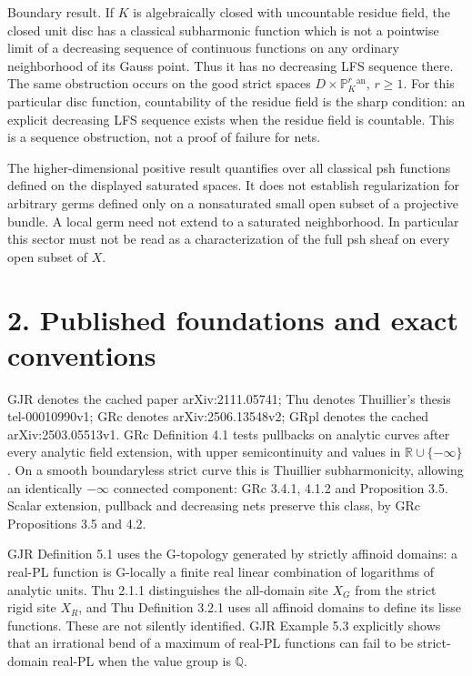 \documentclass[11pt]{article}
\begin{document}
Boundary result. If $K$ is algebraically closed with uncountable residue field, the closed unit disc has a classical subharmonic function which is not a pointwise limit of a decreasing sequence of continuous functions on any ordinary neighborhood of its Gauss point. Thus it has no decreasing LFS sequence there. The same obstruction occurs on the good strict spaces $D\times\mathbb P^r_K{}^{\mathrm{an}}$, $r\geq1$. For this particular disc function, countability of the residue field is the sharp condition: an explicit decreasing LFS sequence exists when the residue field is countable. This is a sequence obstruction, not a proof of failure for nets.

The higher-dimensional positive result quantifies over all classical psh functions defined on the displayed saturated spaces. It does not establish regularization for arbitrary germs defined only on a nonsaturated small open subset of a projective bundle. A local germ need not extend to a saturated neighborhood. In particular this sector must not be read as a characterization of the full psh sheaf on every open subset of $X$.

\section*{2. Published foundations and exact conventions}

GJR denotes the cached paper arXiv:2111.05741; Thu denotes Thuillier's thesis tel-00010990v1; GRc denotes arXiv:2506.13548v2; GRpl denotes the cached arXiv:2503.05513v1. GRc Definition 4.1 tests pullbacks on analytic curves after every analytic field extension, with upper semicontinuity and values in $\mathbb R\cup\{-\infty\}$. On a smooth boundaryless strict curve this is Thuillier subharmonicity, allowing an identically $-\infty$ connected component: GRc 3.4.1, 4.1.2 and Proposition 3.5. Scalar extension, pullback and decreasing nets preserve this class, by GRc Propositions 3.5 and 4.2.

GJR Definition 5.1 uses the G-topology generated by strictly affinoid domains: a real-PL function is G-locally a finite real linear combination of logarithms of analytic units. Thu 2.1.1 distinguishes the all-domain site $X_G$ from the strict rigid site $X_R$, and Thu Definition 3.2.1 uses all affinoid domains to define its lisse functions. These are not silently identified. GJR Example 5.3 explicitly shows that an irrational bend of a maximum of real-PL functions can fail to be strict-domain real-PL when the value group is $\mathbb Q$.
\end{document}
